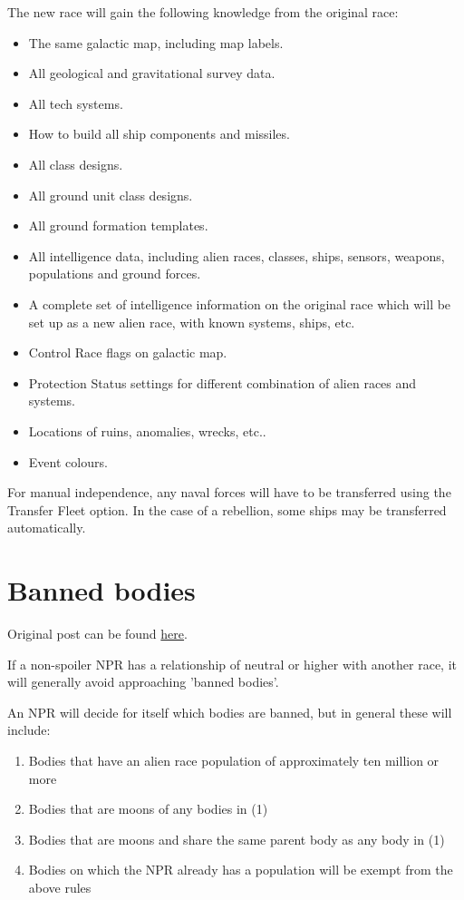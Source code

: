 \documentclass[10pt,a4paper,oneside]{article}
\begin{document}
The new race will gain the following knowledge from the original race:
\begin{itemize}
	\item The same galactic map, including map labels.
	\item All geological and gravitational survey data.
	\item All tech systems.
	\item How to build all ship components and missiles.
	\item All class designs.
	\item All ground unit class designs.
	\item All ground formation templates.
	\item All intelligence data, including alien races, classes, ships, sensors, weapons, populations and ground forces.
	\item A complete set of intelligence information on the original race which will be set up as a new alien race, with known systems, ships, etc.
	\item Control Race flags on galactic map.
	\item Protection Status settings for different combination of alien races and systems.
	\item Locations of ruins, anomalies, wrecks, etc..
	\item Event colours.
\end{itemize}

For manual independence, any naval forces will have to be transferred using the Transfer Fleet option. In the case of a rebellion, some ships may be transferred automatically.


\section{Banned bodies}\label{7_banned_bodies}
Original post can be found
\href{http://aurora2.pentarch.org/index.php?topic=8495.msg119432#msg119432}{here}.
\newline\newline

If a non-spoiler NPR has a relationship of neutral or higher with another race, it will generally avoid approaching 'banned bodies'.

An NPR will decide for itself which bodies are banned, but in general these will include:
\begin{enumerate}
	\item Bodies that have an alien race population of approximately ten million or more
	\item Bodies that are moons of any bodies in (1)
	\item Bodies that are moons and share the same parent body as any body in (1)
	\item Bodies on which the NPR already has a population will be exempt from the above rules
\end{enumerate}
\end{document}
